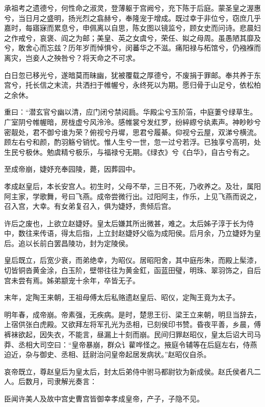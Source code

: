 \documentclass[]{article}
\begin{document}
承祖考之遗德兮，何性命之淑灵，登薄躯于宫阙兮，充下陈于后庭。蒙圣皇之渥惠兮，当日月之盛明，扬光烈之翕赫兮，奉隆宠于增成。既过幸于非位兮，窃庶几乎嘉时，每寤寐而累息兮，申佩离以自思，陈女图以镜监兮，顾女史而问诗。悲晨妇之作戒兮，哀褒、阎之为邮；美皇、英之女虞兮，荣任、姒之母周。虽愚陋其靡及兮，敢舍心而忘兹？历年岁而悼惧兮，闵蕃华之不滋。痛阳禄与柘馆兮，仍襁褓而离灾，岂妾人之殃咎兮？将天命之不可求。

白日忽已移光兮，遂暗莫而昧幽，犹被覆载之厚德兮，不废捐于罪邮。奉共养于东宫兮，托长信之末流，共洒扫于帷幄兮，永终死以为期。愿归骨于山足兮，依松柏之余休。

重曰：``潜玄官兮幽以清，应门闭兮禁闼扃。华殿尘兮玉阶菭，中庭萋兮绿草生。广室阴兮帷幄暗，房栊虚兮风泠泠。感帷裳兮发红罗，纷綷縩兮纨素声。神眇眇兮密靓处，君不御兮谁为荣？俯视兮丹墀，思君兮履綦。仰视兮云屋，双涕兮横流。顾左右兮和颜，酌羽觞兮销忧。惟人生兮一世，忽一过兮若浮。已独享兮高明，处生民兮极休。勉虞精兮极乐，与福禄兮无期。《绿衣》兮《白华》，自古兮有之。

至成帝崩，婕妤充奉园陵，薨，因葬园中。

孝成赵皇后，本长安宫人。初生时，父母不举，三日不死，乃收养之。及壮，属阳阿主家，学歌舞，号曰飞燕。成帝尝微行出。过阳阿主，作乐，上见飞燕而说之，召入宫，大幸。有女弟复召入，俱为婕妤，贵倾后宫。

许后之废也，上欲立赵婕妤。皇太后嫌其所出微甚，难之。太后姊子淳于长为侍中，数往来传语，得太后指，上立封赵婕妤父临为成阳侯。后月余，乃立婕妤为皇后。追以长前白罢昌陵功，封为定陵侯。

皇后既立，后宽少衰，而弟绝幸，为昭仪。居昭阳舍，其中庭彤朱，而殿上髤漆，切皆铜沓黄金涂，白玉阶，壁带往往为黄金釭，函蓝田璧，明珠、翠羽饰之，自后宫未尝有焉。姊弟颛宠十余年，卒皆无子。

末年，定陶王来朝，王祖母傅太后私赂遗赵皇后、昭仪，定陶王竟为太子。

明年春，成帝崩。帝素强，无疾病。是时，楚思王衍、梁王立来朝，明旦当辞去，上宿供张白虎殿。又欲拜左将军孔光为丞相，已刻侯印书赞。昏夜平善，乡晨，傅裤袜欲起，因失衣，不能言，昼漏上十刻而崩。民间归罪赵昭仪，皇太后诏大司马莽、丞相大司空曰：``皇帝暴崩，群众讠雚哗怪之。掖庭令辅等在后庭左右，侍燕迫近，杂与御史、丞相、廷尉治问皇帝起居发病状。''赵昭仪自杀。

哀帝既立，尊赵皇后为皇太后，封太后弟侍中驸马都尉钦为新成侯。赵氏侯者凡二人。后数月，司隶解光奏言：

臣闻许美人及故中宫史曹宫皆御幸孝成皇帝，产子，子隐不见。
\end{document}
